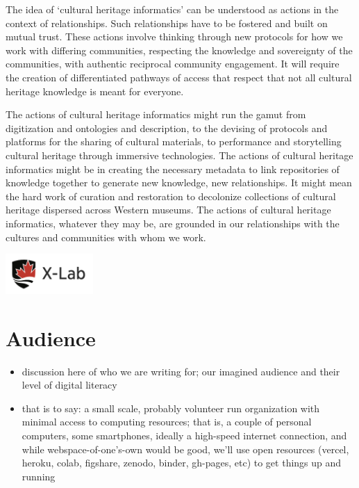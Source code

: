 \documentclass[
]{book}
\providecommand{\tightlist}{%
  \setlength{\itemsep}{0pt}\setlength{\parskip}{0pt}}
\begin{document}
The idea of `cultural heritage informatics' can be understood as actions in the context of relationships. Such relationships have to be fostered and built on mutual trust. These actions involve thinking through new protocols for how we work with differing communities, respecting the knowledge and sovereignty of the communities, with authentic reciprocal community engagement. It will require the creation of differentiated pathways of access that respect that not all cultural heritage knowledge is meant for everyone.

The actions of cultural heritage informatics might run the gamut from digitization and ontologies and description, to the devising of protocols and platforms for the sharing of cultural materials, to performance and storytelling cultural heritage through immersive technologies. The actions of cultural heritage informatics might be in creating the necessary metadata to link repositories of knowledge together to generate new knowledge, new relationships. It might mean the hard work of curation and restoration to decolonize collections of cultural heritage dispersed across Western museums. The actions of cultural heritage informatics, whatever they may be, are grounded in our relationships with the cultures and communities with whom we work.

\includegraphics[width=0.25\textwidth,height=\textheight]{images/cover.png}

\hypertarget{intro}{%
\chapter{Audience}\label{intro}}

\begin{itemize}
\tightlist
\item
  discussion here of who we are writing for; our imagined audience and their level of digital literacy
\item
  that is to say: a small scale, probably volunteer run organization with minimal access to computing resources; that is, a couple of personal computers, some smartphones, ideally a high-speed internet connection, and while webspace-of-one's-own would be good, we'll use open resources (vercel, heroku, colab, figshare, zenodo, binder, gh-pages, etc) to get things up and running
\end{itemize}
\end{document}
